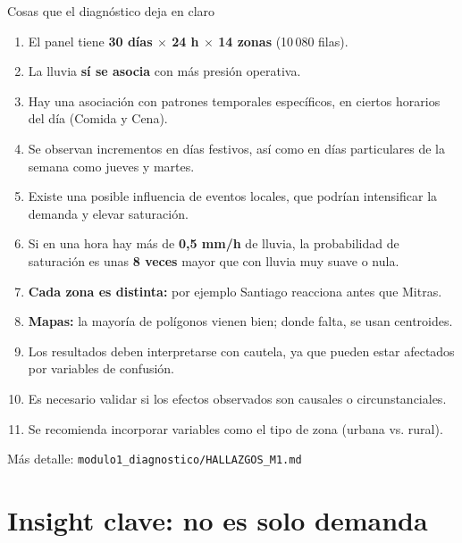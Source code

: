 \documentclass[aspectratio=169,spanish]{beamer}
\begin{document}
\begin{frame}{Cosas que el diagnóstico deja en claro}
  \footnotesize
  \begin{enumerate}
    \item El panel tiene \textbf{30 días $\times$ 24 h $\times$ 14 zonas} (10\,080 filas). 
    \item La lluvia \textbf{sí se asocia} con más presión operativa.
    \item Hay una asociación con patrones temporales específicos, en ciertos horarios del día (Comida y Cena).
    \item Se observan incrementos en días festivos, así como en días particulares de la semana como jueves y martes.
    \item Existe una posible influencia de eventos locales, que podrían intensificar la demanda y elevar saturación.
    \item Si en una hora hay más de \textbf{0{,}5 mm/h} de lluvia, la probabilidad de saturación es unas \textbf{8 veces} mayor que con lluvia muy suave o nula.
    \item \textbf{Cada zona es distinta:} por ejemplo Santiago reacciona antes que Mitras.
    \item \textbf{Mapas:} la mayoría de polígonos vienen bien; donde falta, se usan centroides. 
    \item Los resultados deben interpretarse con cautela, ya que pueden estar afectados por variables de confusión.
    \item Es necesario validar si los efectos observados son causales o circunstanciales.
    \item Se recomienda incorporar variables como el tipo de zona (urbana vs. rural).
  \end{enumerate}
  \vspace{0.25em}
  \tiny Más detalle: \texttt{modulo1\_diagnostico/HALLAZGOS\_M1.md}
\end{frame}




\section{Insight clave: no es solo demanda}
\end{document}
